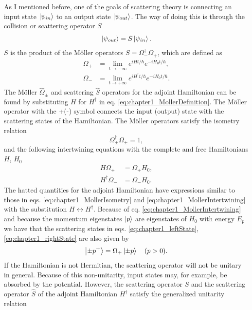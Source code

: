 As I mentioned before, one of the goals of scattering theory is connecting an input state $\ket{\psi_{in}}$ to an output state $\ket{\psi_{out}}$. The way of doing this is through the collision or scattering operator $S$
%
\begin{equation}
  \ket{\psi_{out}} = S \ket{\psi_{in}}
  \label{eq:chapter1_actuationOfSOperator}.
\end{equation}
%
$S$ is the product of the M\"{o}ller operators $S = \Omega_{-}^\dagger\Omega_{+}$, which are defined as
%
\begin{align}
    \Omega_+ &= \lim_{t \to -\infty}e^{i H t / \hbar}e^{-i H_0 t/ \hbar},\nonumber\\
    \Omega_- &= \lim_{t \to +\infty}e^{i H^\dagger t/ \hbar}e^{-i H_0 t/ \hbar}.
    \label{eq:chapter1_MollerDefinition}
\end{align}
%
The M\"{o}ller $\widehat{\Omega}_\pm$ and scattering $\widehat{S}$ operators for the adjoint Hamiltonian can be found by substituting $H$ for $H^\dagger$ in eq. \eqref{eq:chapter1_MollerDefinition}. The M\"{o}ller operator with the +(-) symbol connects the input (output) state with the scattering states of the Hamiltonian. The M\"{o}ller operators satisfy the isometry relation
%
\begin{equation}
  \Omega_\pm^\dagger \Omega_\pm = 1,
  \label{eq:chapter1_MollerIsometry}
\end{equation}
%
and the following intertwining equations with the complete and free Hamiltonians $H$, $H_0$
%
\begin{align}
  H\Omega_+ &= \Omega_+ H_0,\nonumber
  \\
  H^\dagger\Omega_- &= \Omega_- H_0.
  \label{eq:chapter1_MollerIntertwining}
\end{align}
%
The hatted quantities for the adjoint Hamiltonian have expressions similar to those in eqs. \eqref{eq:chapter1_MollerIsometry} and \eqref{eq:chapter1_MollerIntertwining} with the substitution $H\leftrightarrow H^\dagger$. Because of eq. \eqref{eq:chapter1_MollerIntertwining} and because the momentum eigenstates $\ket{p}$ are eigenstates of $H_0$ with energy $E_p$ we have that the scattering states in eqs. \eqref{eq:chapter1_leftState}, \eqref{eq:chapter1_rightState} are also given by
%
\begin{equation}
  \ket{\pm p^+} = \Omega_+ \ket{\pm p}\quad (p>0).
  \label{eq:chapter1_scatteringStateFromMoller}
\end{equation}
%
%
If the Hamiltonian is not Hermitian, the scattering operator will not be unitary in general. Because of this non-unitarity, input states may, for example, be absorbed by the potential. However, the scattering operator $S$ and the scattering operator $\widehat{S}$ of the adjoint Hamiltonian $H^\dagger$ satisfy the generalized unitarity relation
